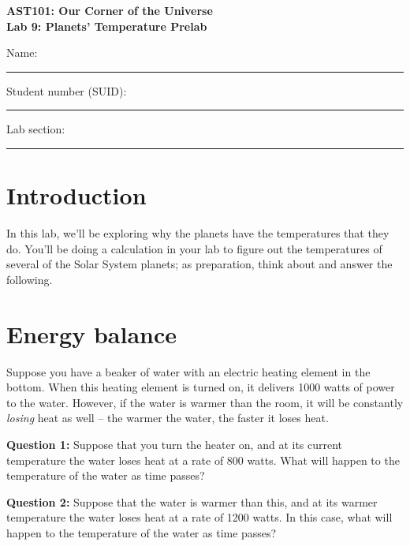 \documentclass[11pt]{article}
\begin{document}
\begin{center}
\textbf{\Large
AST101: Our Corner of the Universe \\
\vspace*{0.1cm}
Lab 9: Planets' Temperature Prelab 
}
\end{center}

\vspace*{0.5cm}

{\Large Name:}\vspace*{0.5cm}\\\hrule
{\Large Student number (SUID):}\vspace*{0.5cm}\\\hrule
{\Large Lab section:}\vspace*{0.5cm}\\\hrule
\vspace*{0.5cm}

\section{Introduction}

In this lab, we'll be exploring why the planets have the temperatures that they do. You'll be doing a calculation in your 
lab to figure out the temperatures of several of the Solar System planets; as preparation, think about and answer the 
following.

\section{Energy balance}

Suppose you have a beaker of water with an electric heating element in the bottom. When this heating element is turned on, it delivers
1000 watts of power to the water. However, if the water is warmer than the room, it will be constantly
{\it losing} heat as well -- the warmer the water, the faster it loses heat.

{\bf Question 1:} Suppose that you turn the heater on, and at its current temperature the water loses heat at a rate of 
800 watts. What will happen to the temperature of the water as time passes?

\vspace{1in}

{\bf Question 2:} Suppose that the water is warmer than this, and at its warmer temperature the water loses heat at a rate
of 1200 watts. In this case, what will happen to the temperature of the water as time passes?
\end{document}
